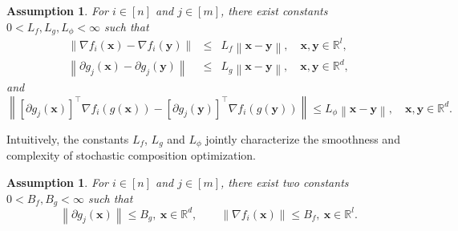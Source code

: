 \documentclass[11pt]{article}
\newtheorem{assumption}[theorem]{Assumption}
\newcommand{\x}{\mathbf x}
\newcommand{\y}{\mathbf y}
\newcommand{\br}{\mathbb{R}}
\begin{document}
\begin{assumption}\label{Assumption:Smooth-Gradient-Jacobian}
For $i\in[n]$ and $j\in[m]$, there exist constants $0<L_f, L_g, L_{\phi}<\infty$ such that
\begin{eqnarray*}
\left\| \nabla f_i(\x) - \nabla f_i(\y)\right\| & \leq & L_f \left\|\x-\y\right\|, \quad \x, \y \in \br^l, \\
\left\| \partial g_j(\x) - \partial g_j(\y)\right\| & \leq & L_g \left\|\x-\y\right\|, \quad \x, \y \in \br^d,
\end{eqnarray*}
and
\begin{equation*}
\left\| \left[\partial g_j(\x)\right]^\top \nabla f_i(g(\x))- \left[\partial g_j(\y)\right]^\top \nabla f_i(g(\y))\right\| \leq L_{\phi}\left\|\x-\y\right\|, \quad \x, \y \in \br^d. 
\end{equation*}
\end{assumption}
Intuitively, the constants $L_f$, $L_g$ and $L_\phi$ jointly characterize the smoothness and complexity of stochastic composition optimization. 
\begin{assumption}\label{Assumption:Bound-Jacobian-Gradient}
For $i\in[n]$ and $j\in[m]$, there exist two constants $0 < B_f, B_g < \infty$ such that
\begin{equation*}
\left\| \partial g_j(\x) \right\| \leq B_g, \ \x\in\br^d, \qquad \left\| \nabla f_i(\x) \right\| \leq B_f, \ \x \in \br^l. 
\end{equation*}
\end{assumption}
\end{document}
